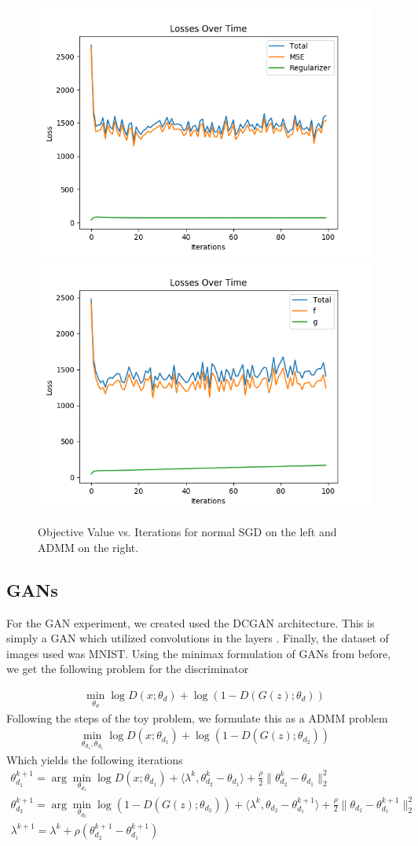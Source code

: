 \documentclass{article}
\begin{document}
  \begin{figure}[H]
    \includegraphics[width=0.4\linewidth]{./images/toy_loss.png}
    \includegraphics[width=0.4\linewidth]{./images/toy_admm_loss.png}
    \caption{Objective Value vs. Iterations for normal SGD on the left and ADMM on the right.}
    \label{fig:toy-results}
  \end{figure}

  \subsection{GANs}

  For the GAN experiment, we created used the DCGAN architecture. This is simply a GAN which utilized convolutions in the layers \cite{radford_2015}. Finally, the dataset of images used was MNIST. Using the minimax formulation of GANs from before, we get the following problem for the discriminator

  \begin{gather*}
    \min_{\theta_d} \log D(x; \theta_d) + \log (1 - D(G(z); \theta_d))
  \end{gather*}
  Following the steps of the toy problem, we formulate this as a ADMM problem
  \begin{gather*}
    \min_{\theta_{d_1}, \theta_{d_2}} \log D(x; \theta_{d_1}) + \log (1 - D(G(z); \theta_{d_2}))
  \end{gather*}
  Which yields the following iterations
  \begin{gather*}
    \theta_{d_1}^{k+1} = \arg\min_{\theta_{d_1}} \log D(x ; \theta_{d_1}) + \langle \lambda^k, \theta_{d_2}^k - \theta_{d_1} \rangle + \frac{\rho}{2} \lVert \theta_{d_2}^k - \theta_{d_1} \rVert_2^2 \\
    \theta_{d_2}^{k+1} = \arg\min_{\theta_{d_2}} \log(1 - D(G(z) ; \theta_{d_2})) + \langle \lambda^k, \theta_{d_2} - \theta_{d_1}^{k+1} \rangle + \frac{\rho}{2} \lVert \theta_{d_2} - \theta_{d_1}^{k+1} \rVert_2^2 \\
    \lambda^{k+1} = \lambda^k + \rho (\theta_{d_2}^{k+1} - \theta_{d_1}^{k+1})
  \end{gather*}
\end{document}
